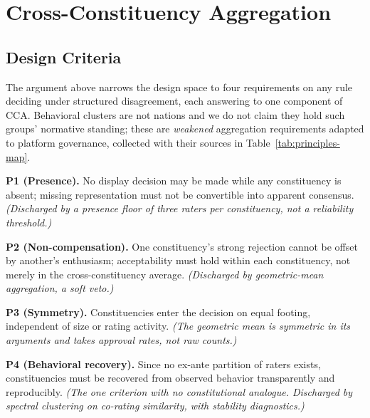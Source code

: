 \documentclass[10pt,twocolumn]{article}
\begin{document}
\section{Cross-Constituency Aggregation}
\label{sec:cca}

\subsection*{Design Criteria}

The argument above narrows the design space to four requirements on any rule
deciding under structured disagreement, each answering to one component of CCA.
Behavioral clusters are not nations and we do not claim they hold such groups'
normative standing; these are \emph{weakened} aggregation requirements adapted
to platform governance, collected with their sources in
Table~\ref{tab:principles-map}.

\textbf{P1 (Presence).} No display decision may be made while any constituency
is absent; missing representation must not be convertible into apparent
consensus. \emph{(Discharged by a presence floor of three raters per
constituency, not a reliability threshold.)}

\textbf{P2 (Non-compensation).} One constituency's strong rejection cannot be
offset by another's enthusiasm; acceptability must hold within each
constituency, not merely in the cross-constituency average. \emph{(Discharged by
geometric-mean aggregation, a soft veto.)}

\textbf{P3 (Symmetry).} Constituencies enter the decision on equal footing,
independent of size or rating activity. \emph{(The geometric mean is symmetric
in its arguments and takes approval rates, not raw counts.)}

\textbf{P4 (Behavioral recovery).} Since no ex-ante partition of raters exists,
constituencies must be recovered from observed behavior transparently and
reproducibly. \emph{(The one criterion with no constitutional analogue.
Discharged by spectral clustering on co-rating similarity, with stability
diagnostics.)}
\end{document}
